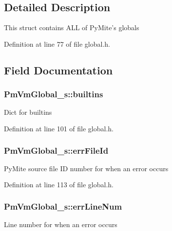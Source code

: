 \subsection{Detailed Description}
This struct contains A\-L\-L of Py\-Mite's globals 

Definition at line 77 of file global.\-h.



\subsection{Field Documentation}
\hypertarget{struct_pm_vm_global__s_a1e7d13661ffdd00ff167d9db9c880df5}{
\subsubsection[{builtins}]{ Pm\-Vm\-Global\-\_\-s\-::builtins}}\label{struct_pm_vm_global__s_a1e7d13661ffdd00ff167d9db9c880df5}
Dict for builtins 

Definition at line 101 of file global.\-h.

\hypertarget{struct_pm_vm_global__s_acf7a9c56a247f4eac04da55e274c6350}{
\subsubsection[{err\-File\-Id}]{ Pm\-Vm\-Global\-\_\-s\-::err\-File\-Id}}\label{struct_pm_vm_global__s_acf7a9c56a247f4eac04da55e274c6350}
Py\-Mite source file I\-D number for when an error occurs 

Definition at line 113 of file global.\-h.

\hypertarget{struct_pm_vm_global__s_ad64f6a7643a51b05f3d2249e0c67998c}{
\subsubsection[{err\-Line\-Num}]{ Pm\-Vm\-Global\-\_\-s\-::err\-Line\-Num}}\label{struct_pm_vm_global__s_ad64f6a7643a51b05f3d2249e0c67998c}
Line number for when an error occurs 

